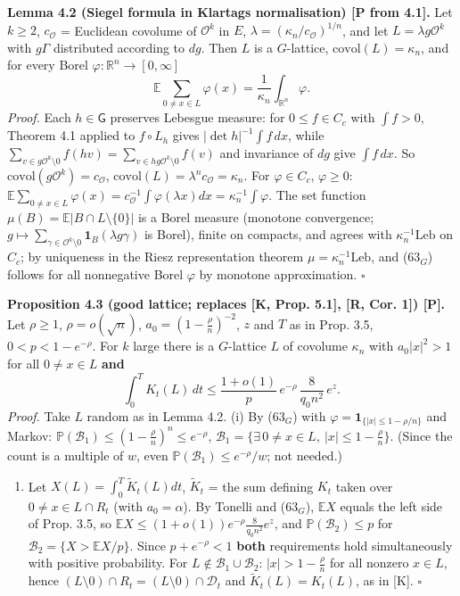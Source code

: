 \textbf{Lemma 4.2 (Siegel formula in Klartag\textquotesingle s normalisation) {[}P from 4.1{]}.} Let \(k\ge2\), \(c_{\mathcal O}\) = Euclidean covolume of \(\mathcal O^k\) in \(E\), \(\lambda=(\kappa_n/c_{\mathcal O})^{1/n}\),
and let \(L=\lambda g\mathcal O^k\) with \(g\Gamma\) distributed according to \(dg\). Then \(L\) is a \(G\)-lattice, \(\mathrm{covol}(L)=\kappa_n\), and for every Borel \(\varphi:\mathbb R^n\to[0,\infty]\)
\[\mathbb E\sum_{0\ne x\in L}\varphi(x)=\frac1{\kappa_n}\int_{\mathbb R^n}\varphi .\tag{63$_G$}\]
\emph{Proof.} Each \(h\in\mathsf G\) preserves Lebesgue measure: for \(0\le f\in C_c\) with \(\int f>0\), Theorem 4.1 applied to \(f\circ L_h\) gives \(|\det h|^{-1}\int f\,dx\), while
\(\sum_{v\in g\mathcal O^k\setminus0}f(hv)=\sum_{v\in hg\mathcal O^k\setminus0}f(v)\) and invariance of \(dg\) give \(\int f\,dx\). So \(\mathrm{covol}(g\mathcal O^k)=c_{\mathcal O}\),
\(\mathrm{covol}(L)=\lambda^nc_{\mathcal O}=\kappa_n\). For \(\varphi\in C_c\), \(\varphi\ge0\): \(\mathbb E\sum_{0\ne x\in L}\varphi(x)=c_{\mathcal O}^{-1}\int\varphi(\lambda x)dx=\kappa_n^{-1}\int\varphi\).
The set function \(\mu(B)=\mathbb E|B\cap L\setminus\{0\}|\) is a Borel measure (monotone convergence; \(g\mapsto\sum_{\gamma\in\mathcal O^k\setminus0}\mathbf 1_B(\lambda g\gamma)\) is Borel),
finite on compacts, and agrees with \(\kappa_n^{-1}\mathrm{Leb}\) on \(C_c\); by uniqueness in the Riesz representation theorem \(\mu=\kappa_n^{-1}\mathrm{Leb}\), and (63\(_G\)) follows for
all nonnegative Borel \(\varphi\) by monotone approximation. \(\square\)

\textbf{Proposition 4.3 (good lattice; replaces {[}K, Prop. 5.1{]}, {[}R, Cor. 1{]}) {[}P{]}.} Let \(\rho\ge1\), \(\rho=o(\sqrt n)\), \(a_0=(1-\frac\rho n)^{-2}\), \(z\) and \(T\) as in Prop. 3.5, \(0<p<1-e^{-\rho}\).
For \(k\) large there is a \(G\)-lattice \(L\) of covolume \(\kappa_n\) with \(a_0|x|^2>1\) for all \(0\ne x\in L\) \textbf{and}
\[\int_0^TK_t(L)\,dt\le\frac{1+o(1)}{p}\,e^{-\rho}\,\frac{8}{q_0n^2}\,e^z .\]
\emph{Proof.} Take \(L\) random as in Lemma 4.2. (i) By (63\(_G\)) with \(\varphi=\mathbf 1_{\{|x|\le1-\rho/n\}}\) and Markov: \(\mathbb P(\mathcal B_1)\le(1-\frac\rho n)^n\le e^{-\rho}\),
\(\mathcal B_1=\{\exists\,0\ne x\in L,\ |x|\le1-\frac\rho n\}\). (Since the count is a multiple of \(w\), even \(\mathbb P(\mathcal B_1)\le e^{-\rho}/w\); not needed.)

\begin{enumerate}
\def\labelenumi{(\roman{enumi})}
\setcounter{enumi}{1}
\tightlist
\item
  Let \(X(L)=\int_0^T\tilde K_t(L)dt\), \(\tilde K_t\) = the sum defining \(K_t\) taken over \(0\ne x\in L\cap R_t\) (with \(a_0=\alpha\)). By Tonelli and (63\(_G\)),
  \(\mathbb EX\) equals the left side of Prop. 3.5, so \(\mathbb EX\le(1+o(1))e^{-\rho}\frac8{q_0n^2}e^z\), and \(\mathbb P(\mathcal B_2)\le p\) for \(\mathcal B_2=\{X>\mathbb EX/p\}\).
  Since \(p+e^{-\rho}<1\) \textbf{both} requirements hold simultaneously with positive probability. For \(L\notin\mathcal B_1\cup\mathcal B_2\): \(|x|>1-\frac\rho n\) for all nonzero \(x \in L\), hence
  \((L\setminus0)\cap R_t=(L\setminus0)\cap\mathcal D_t\) and \(\tilde K_t(L)=K_t(L)\), as in {[}K{]}. \(\square\)
\end{enumerate}

